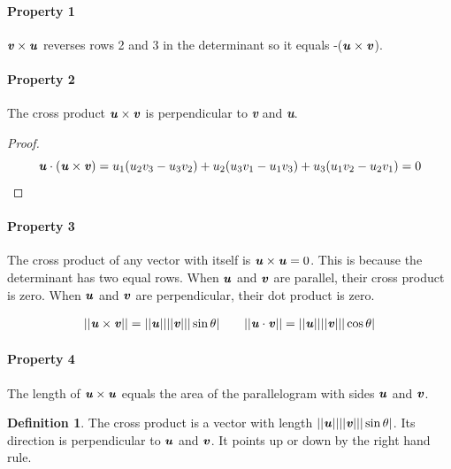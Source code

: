 \documentclass[12pt, letterpaper]{article}
\newcommand{\V}[1]{\textbf{\textit{#1}}}
\newcommand{\DefinitionSpace}{\vspace{15px}}
\theoremstyle{definition}
\newtheorem{definition}{Definition}[section]
\begin{document}
	
\paragraph{Property 1} $\V{v} \times \V{u}$ reverses rows 2 and 3 in the determinant so it equals -($\V{u} \times \V{v}$).

\paragraph{Property 2} The cross product $\V{u} \times \V{v}$ is perpendicular to \V{v} and \V{u}.
	\begin{proof}
		\begin{equation*}
			\V{u} \cdot (\V{u} \times \V{v}) = u_1(u_2v_3 - u_3v_2) + u_2(u_3v_1 - u_1v_3) + u_3(u_1v_2 - u_2v_1) = 0
		\end{equation*}
	\end{proof}

\paragraph{Property 3} The cross product of any vector with itself is $\V{u} \times \V{u} = 0$. This is because the determinant has two equal rows. When $\V{u}$ and $\V{v}$ are parallel, their cross product is zero. When $\V{u}$ and $\V{v}$ are perpendicular, their dot product is zero.

	\begin{gather*}
		||\V{u} \times \V{v}|| =  ||\V{u}||||\V{v}|||\sin{\theta}|   \qquad ||\V{u} \cdot \V{v}|| = ||\V{u}||||\V{v}|||\cos{\theta}|
	\end{gather*}

\paragraph{Property 4} The length of $\V{u} \times \V{u}$ equals the area of the parallelogram with sides $\V{u}$ and $\V{v}$.

	\DefinitionSpace
	\begin{definition}
		The cross product is a vector with length $||\V{u}|| ||\V{v}|| |\sin{\theta}|$. Its direction is perpendicular to $\V{u}$ and $\V{v}$. It points up or down by the right hand rule.
	\end{definition}
\end{document}
